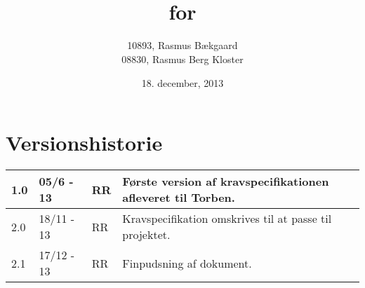 \documentclass[oneside, 12pt]{memoir}
\title{\DocumentType \\ for \\ \ProjectName}
\date{18. december, 2013}
\author{10893, Rasmus Bækgaard\\08830, Rasmus Berg Kloster}
\begin{document}
\begin{titlingpage}
	
\end{titlingpage}


\section*{Versionshistorie}
\begin{tabular}{p{}|p{}|p{}|p{}}
\hline 
1.0 & 05/6 - 13 & RR & Første version af kravspecifikationen afleveret til Torben.
\\ \hline 
2.0 & 18/11 - 13 & RR & Kravspecifikation omskrives til at passe til projektet.
\\\hline 
2.1 & 17/12 - 13 & RR & Finpudsning af dokument.
\\\hline
\end{tabular} 





\newpage
\tableofcontents* %
\newpage
\listoffigures* %

\listoffixmes 







\newpage
\appendix


{\RaggedRight
}
\end{document}
